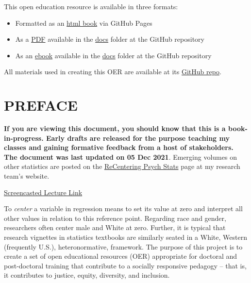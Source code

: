\documentclass[
]{book}
\providecommand{\tightlist}{%
  \setlength{\itemsep}{0pt}\setlength{\parskip}{0pt}}
\begin{document}
This open education resource is available in three formats:

\begin{itemize}
\tightlist
\item
  Formatted as an \href{https://lhbikos.github.io/extRas/}{html book} via GitHub Pages
\item
  As a \href{https://github.com/lhbikos/extRas/blob/main/docs/ReC_extRas.pdf}{PDF} available in the \href{https://github.com/lhbikos/extRas/tree/main/docs}{docs} folder at the GitHub repository
\item
  As an \href{https://github.com/lhbikos/extRas/blob/main/docs/ReC_extRas.epub}{ebook} available in the \href{https://github.com/lhbikos/extRas/tree/main/docs}{docs} folder at the GitHub repository
\end{itemize}

All materials used in creating this OER are available at its \href{https://github.com/lhbikos/extRas}{GitHub repo}.

\hypertarget{preface}{%
\chapter*{PREFACE}\label{preface}}

\textbf{If you are viewing this document, you should know that this is a book-in-progress. Early drafts are released for the purpose teaching my classes and gaining formative feedback from a host of stakeholders. The document was last updated on 05 Dec 2021}. Emerging volumes on other statistics are posted on the \href{https://lhbikos.github.io/BikosRVT/ReCenter.html}{ReCentering Psych Stats} page at my research team's website.

\href{https://spu.hosted.panopto.com/Panopto/Pages/Viewer.aspx?id=c932455e-ef06-444a-bdca-acf7012d759a}{Screencasted Lecture Link}

To \emph{center} a variable in regression means to set its value at zero and interpret all other values in relation to this reference point. Regarding race and gender, researchers often center male and White at zero. Further, it is typical that research vignettes in statistics textbooks are similarly seated in a White, Western (frequently U.S.), heteronormative, framework. The purpose of this project is to create a set of open educational resources (OER) appropriate for doctoral and post-doctoral training that contribute to a socially responsive pedagogy -- that is, it contributes to justice, equity, diversity, and inclusion.
\end{document}
